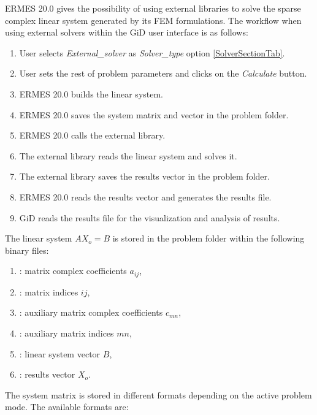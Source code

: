 ERMES 20.0 gives the possibility of using external libraries to solve the sparse complex linear system generated by its FEM formulations. The workflow when using external solvers within the GiD user interface is as follows:
\begin{enumerate}\itemsep0em 
	\item User selects \textit{External\_solver} as \textit{Solver\_type} option \ref{SolverSectionTab}.
	\item User sets the rest of problem parameters and clicks on the \textit{Calculate} button.
	\item ERMES 20.0 builds the linear system.
	\item ERMES 20.0 saves the system matrix and vector in the problem folder.
	\item ERMES 20.0 calls the external library.
	\item The external library reads the linear system and solves it.
	\item The external library saves the results vector in the problem folder. 
	\item ERMES 20.0 reads the results vector and generates the results file.
	\item GiD reads the results file for the visualization and analysis of results.
\end{enumerate}
The linear system $A X_{o} = B$ is stored in the problem folder within the following binary files:
\begin{enumerate}\itemsep0em 
	\item {}: matrix complex coefficients $a_{ij}$,
	\item {}: matrix indices $ij$,
	\item {}: auxiliary matrix complex coefficients $c_{mn}$,
    \item {}: auxiliary matrix indices $mn$,
	\item {}: linear system vector $B$,
	\item {}: results vector $X_{o}$.
\end{enumerate}
The system matrix is stored in different formats depending on the active problem mode. The available formats are:
